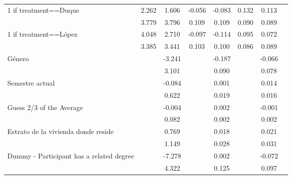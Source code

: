 \begin{table}[H]
{\begin{threeparttable}
\begin{tabular}{lccccccc}
\midrule
1 if treatment==Duque&       2.262         &       1.606         &      -0.056         &      -0.083         &       0.132         &       0.113         \\
                    &       3.779         &       3.796         &       0.109         &       0.109         &       0.090         &       0.089         \\
1 if treatment==López&       4.048         &       2.710         &      -0.097         &      -0.114         &       0.095         &       0.072         \\
                    &       3.385         &       3.441         &       0.103         &       0.100         &       0.086         &       0.089         \\
Género             &                     &      -3.241         &                     &      -0.187\sym{**} &                     &      -0.066         \\
                    &                     &       3.101         &                     &       0.090         &                     &       0.078         \\
Semestre actual     &                     &      -0.084         &                     &       0.001         &                     &       0.014         \\
                    &                     &       0.622         &                     &       0.019         &                     &       0.016         \\
Guess 2/3 of the Average&                     &      -0.004         &                     &       0.002         &                     &      -0.001         \\
                    &                     &       0.082         &                     &       0.002         &                     &       0.002         \\
Estrato de la vivienda donde reside&                     &       0.769         &                     &       0.018         &                     &       0.021         \\
                    &                     &       1.149         &                     &       0.028         &                     &       0.031         \\
Dummy - Participant has a related degree&                     &      -7.278\sym{*}  &                     &       0.002         &                     &      -0.072         \\
                    &                     &       4.322         &                     &       0.125         &                     &       0.097         \\

\end{tabular}
\end{threeparttable}}
\end{table}
